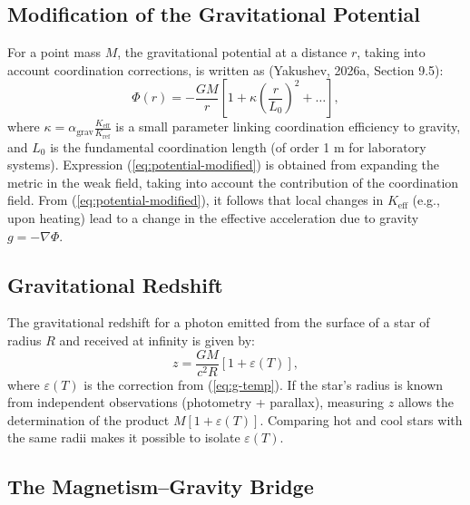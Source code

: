 \documentclass[12pt]{article}
\theoremstyle{remark}
\newcommand{\Keff}{K_{\mathrm{eff}}}
\newcommand{\eps}{\varepsilon}
\begin{document}
	\subsection{Modification of the Gravitational Potential}
	\label{subsec:potential}
	
	For a point mass $M$, the gravitational potential at a distance $r$, taking into account coordination corrections, is written as (Yakushev, 2026a, Section 9.5):
	\begin{equation}
		\Phi(r) = -\frac{GM}{r} \left[ 1 + \kappa \left( \frac{r}{L_0} \right)^2 + \dots \right],
		\label{eq:potential-modified}
	\end{equation}
	where $\kappa = \alpha_{\text{grav}} \frac{\Keff}{K_{\text{ref}}}$ is a small parameter linking coordination efficiency to gravity, and $L_0$ is the fundamental coordination length (of order 1 m for laboratory systems). Expression (\ref{eq:potential-modified}) is obtained from expanding the metric in the weak field, taking into account the contribution of the coordination field. From (\ref{eq:potential-modified}), it follows that local changes in $\Keff$ (e.g., upon heating) lead to a change in the effective acceleration due to gravity $g = -\nabla \Phi$.
	
	\subsection{Gravitational Redshift}
	\label{subsec:redshift}
	
	The gravitational redshift for a photon emitted from the surface of a star of radius $R$ and received at infinity is given by:
	\begin{equation}
		z = \frac{GM}{c^2 R} \left[ 1 + \eps(T) \right],
		\label{eq:redshift}
	\end{equation}
	where $\eps(T)$ is the correction from (\ref{eq:g-temp}). If the star's radius is known from independent observations (photometry + parallax), measuring $z$ allows the determination of the product $M[1+\eps(T)]$. Comparing hot and cool stars with the same radii makes it possible to isolate $\eps(T)$.
	
	\subsection{The Magnetism–Gravity Bridge}
	\label{subsec:magnetism-gravity}
	
\end{document}
